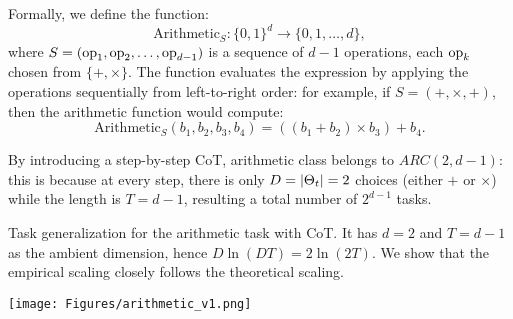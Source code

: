Formally, we define the function:
\[
\text{Arithmetic}_{S} \colon \{0,1\}^d \to \{0,1,\dots,d\},
\]
where \( S = (\textrm{op}_1, \textrm{op}_2, \dots, \textrm{op}_{d-1}) \) is a sequence of \( d-1 \) operations, each \( \textrm{op}_k \) chosen from \( \{+, \times\} \). The function evaluates the expression by applying the operations sequentially from left-to-right order: for example, if \( S = (+, \times, +) \), then the arithmetic function would compute:
\[
\text{Arithmetic}_{S}(b_1, b_2, b_3, b_4) = ((b_1 + b_2) \times b_3) + b_4.
\]





By introducing a step-by-step CoT, arithmetic class belongs to $ARC(2, d-1)$: this is because at every step, there is only $D = |\Theta_t| = 2$ choices (either $+$ or $\times$) while the length is  $T = d-1$, resulting a total number of $2^{d-1}$ tasks. 


\begin{minipage}{0.5\textwidth}  %
    Task generalization for the arithmetic task with CoT. It has $d =2$ and $T = d-1$ as the ambient dimension, hence $D\ln(DT) = 2\ln(2T)$. We show that the empirical scaling closely follows the theoretical scaling.
\end{minipage}
\hfill
\begin{minipage}{0.4\textwidth}  %
    \centering
    \texttt{[image: Figures/arithmetic\_v1.png]}
    \label{fig:arithmetic}  %
\end{minipage}

